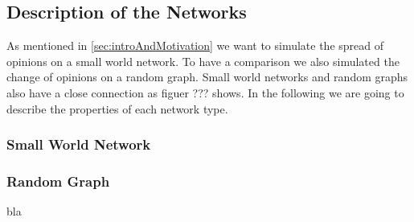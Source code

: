 \subsection{Description of the Networks}
\label{subsec:descriptionofnetwork}
As mentioned in \ref{sec:introAndMotivation} we want to simulate the spread of opinions on a small world network. To have a comparison we also simulated the change of opinions on a random graph. Small world networks and random graphs also have a close connection as figuer ??? shows. In the following we are going to describe the properties of each network type.


\subsubsection{Small World Network}
\label{subsubsec:smallworld}


\subsubsection{Random Graph}
\label{subsubsec:randomgraph}
bla